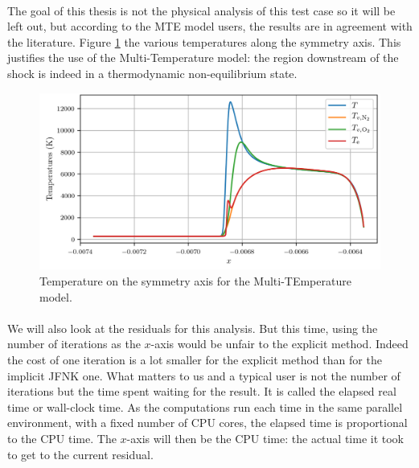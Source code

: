         \paragraph{}
        The goal of this thesis is not the physical analysis of this test case so it will be left out, but according to the MTE model users, the results are in agreement with the literature.
        Figure \ref{fig:sphere_mte_temperatures} the various temperatures along the symmetry axis.
        This justifies the use of the Multi-Temperature model: the region downstream of the shock is indeed in a thermodynamic non-equilibrium state.

        \begin{figure}
          \centering
          \includegraphics{figures/sphere_mte_temperatures.png}
          \caption{Temperature on the symmetry axis for the Multi-TEmperature model.}
          \label{fig:sphere_mte_temperatures}
        \end{figure}

        \paragraph{}
        We will also look at the residuals for this analysis.
        But this time, using the number of iterations as the $x$-axis would be unfair to the explicit method.
        Indeed the cost of one iteration is a lot smaller for the explicit method than for the implicit JFNK one.
        What matters to us and a typical user is not the number of iterations but the time spent waiting for the result.
        It is called the elapsed real time or wall-clock time.
        As the computations run each time in the same parallel environment, with a fixed number of CPU cores, the elapsed time is proportional to the CPU time.
        The $x$-axis will then be the CPU time: the actual time it took to get to the current residual.


